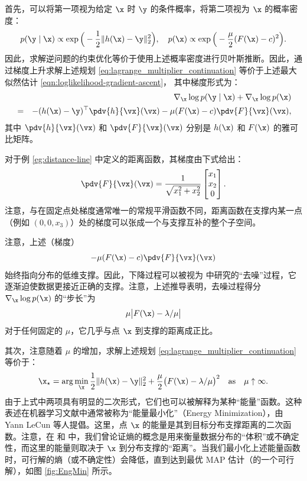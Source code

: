 \documentclass[../../book-main_zh.tex]{subfiles}
\begin{document}
首先，可以将第一项视为给定 $\x$ 时 $\y$ 的条件概率，将第二项视为 $\x$ 的概率密度：
\begin{equation}
    p(\y\mid \x) \propto \exp\Big(- \frac{1}{2}\|h(\x) - \y\|_2^2\Big), \quad
    p(\x) \propto \exp\Big( - \frac{\mu}{2}(F(\x) - c)^2\Big).
\end{equation}
因此，求解逆问题的约束优化等价于使用上述概率密度进行贝叶斯推断。因此，通过梯度上升求解上述规划 \eqref{eq:lagrange_multiplier_continuation} 等价于上述最大似然估计 \eqref{eqn:loglikelihood-gradient-ascent}，
其中梯度形式为：
\begin{eqnarray}
    && \nabla_{\x} \log p(\y \mid \x) + \nabla_{\x} \log p(\x)  \\
    &=&  - (h(\x) - \y)^\top \pdv{h}{\vx}(\vx) -  \mu
    (F(\x) - c) \pdv{F}{\vx}(\vx), \label{eqn:EngMin-gradient}
\end{eqnarray}
其中 $\pdv{h}{\vx}(\vx)$ 和 $\pdv{F}{\vx}(\vx)$ 分别是 $h(\x)$ 和 $F(\x)$ 的雅可比矩阵。
\begin{example}[$F(\x)$ 的梯度] 对于例 \ref{eg:distance-line} 中定义的距离函数，其梯度由下式给出：
    \begin{equation}
        \pdv{F}{\vx}(\vx) =  \frac{1}{\sqrt{x_1^2 + x_2^2}}\left[
            \begin{matrix}
                x_1 \\ x_2 \\ 0
        \end{matrix}\right].
    \end{equation}
    注意，与在固定点处梯度通常唯一的常规平滑函数不同，距离函数在支撑内某一点（例如 $(0, 0, x_3)$）处的梯度可以张成一个与支撑互补的整个子空间。
\end{example}

注意，上述（梯度）
$$-  \mu (F(\x) - c) \pdv{F}{\vx}(\vx)$$ 始终指向分布的低维支撑。因此，下降过程可以被视为  中研究的“去噪”过程，它逐渐迫使数据更接近正确的支撑。注意，上述推导表明，去噪过程得分 $\nabla_{\x} \log p(\x)$ 的“步长”为 $$\mu \big| F(\x) -
\lambda/\mu\big|$$ 对于任何固定的 $\mu$，它几乎与点 $\x$ 到支撑的距离成正比。

其次，注意随着 $\mu$ 的增加，求解上述规划 \eqref{eq:lagrange_multiplier_continuation} 等价于：
\begin{equation}
    \x_\star = \arg\min_{\x} \frac{1}{2}\|h(\x) - \y\|_2^2 +
    \frac{\mu}{2} \big(F(\x) - \lambda/\mu\big)^2 \quad \mbox{as}
    \quad \mu \uparrow \infty.
    \label{eqn:energy-minimization}
\end{equation}
由于上式中两项具有明显的二次形式，它们也可以被解释为某种“能量”函数。这种表述在机器学习文献中通常被称为“能量最小化”（Energy Minimization），由 Yann LeCun \cite{LeCun-2006} 等人提倡。这里，点 $\x$ 的能量是其到目标分布支撑距离的二次函数。注意，在  和  中，我们曾论证熵的概念是用来衡量数据分布的“体积”或不确定性，而这里的能量则取决于 $\x$ 到分布支撑的“距离”。当我们最小化上述能量函数时，可行解的熵（或不确定性）会降低，直到达到最优 MAP 估计（的一个可行解），如图 \ref{fig:EngMin} 所示。
\end{document}
